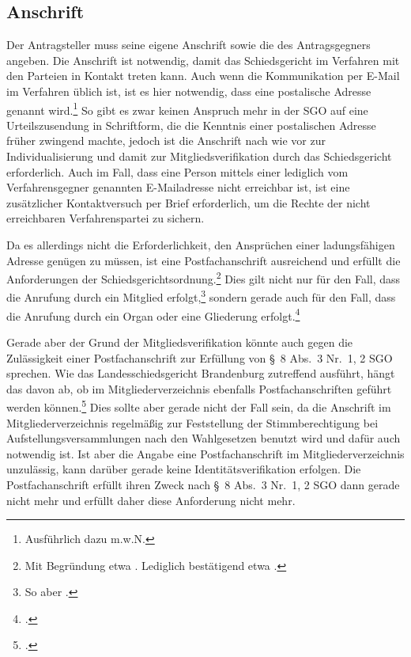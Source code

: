 \subsection{Anschrift}
\label{Anrufung:Statthaftigkeit:Anschrift}
Der Antragsteller muss seine eigene Anschrift sowie die des Antragsgegners angeben.
Die Anschrift ist notwendig, damit das Schiedsgericht im Verfahren mit den Parteien in Kontakt treten kann.
Auch wenn die Kommunikation per E-Mail im Verfahren üblich ist, ist es hier notwendig, dass eine postalische Adresse genannt wird.\footnote{Ausführlich dazu \cite[S. 3]{BSG20130715} m.w.N.}
So gibt es zwar keinen Anspruch mehr in der SGO auf eine Urteilszusendung in Schriftform, die die Kenntnis einer postalischen Adresse früher zwingend machte, jedoch ist die Anschrift nach wie vor zur Individualisierung und damit zur Mitgliedsverifikation durch das Schiedsgericht erforderlich. Auch im Fall, dass eine Person mittels einer lediglich vom Verfahrensgegner genannten E-Mailadresse nicht erreichbar ist, ist eine zusätzlicher Kontaktversuch per Brief erforderlich, um die Rechte der nicht erreichbaren Verfahrenspartei zu sichern.

Da es allerdings nicht die Erforderlichkeit, den Ansprüchen einer ladungsfähigen Adresse genügen zu müssen, ist eine Postfachanschrift ausreichend und erfüllt die Anforderungen der Schiedsgerichtsordnung.\footnote{Mit Begründung etwa \cites[3]{BSG20130715}[S.~4 Rn~16]{LSGBB145}{LSGBB134}. Lediglich bestätigend etwa \cites[7]{LSGBB133}[S.~10~f. Rn~48]{LSGBB146}.}
Dies gilt nicht nur für den Fall, dass die Anrufung durch ein Mitglied erfolgt,\footnote{So aber \cites[S.~1]{LSGBB134}.} sondern gerade auch für den Fall, dass die Anrufung durch ein Organ oder eine Gliederung erfolgt.\footnote{\cites[S.~2~f.]{BSG20131230}.}

Gerade aber der Grund der Mitgliedsverifikation könnte auch gegen die Zulässigkeit einer Postfachanschrift zur Erfüllung von \S~8 Abs.~3 Nr.~1, 2 SGO sprechen.
Wie das Landesschiedsgericht Brandenburg zutreffend ausführt, hängt das davon ab, ob im Mitgliederverzeichnis ebenfalls Postfachanschriften geführt werden können.\footnote{\cites[S.~4 Rn~16]{LSGBB145}.}
Dies sollte aber gerade nicht der Fall sein, da die Anschrift im Mitgliederverzeichnis regelmäßig zur Feststellung der Stimmberechtigung bei Aufstellungsversammlungen nach den Wahlgesetzen benutzt wird und dafür auch notwendig ist.
Ist aber die Angabe eine Postfachanschrift im Mitgliederverzeichnis unzulässig, kann darüber gerade keine Identitätsverifikation erfolgen.
Die Postfachanschrift erfüllt ihren Zweck nach \S~8 Abs.~3 Nr.~1, 2 SGO dann gerade nicht mehr und erfüllt daher diese Anforderung nicht mehr.

